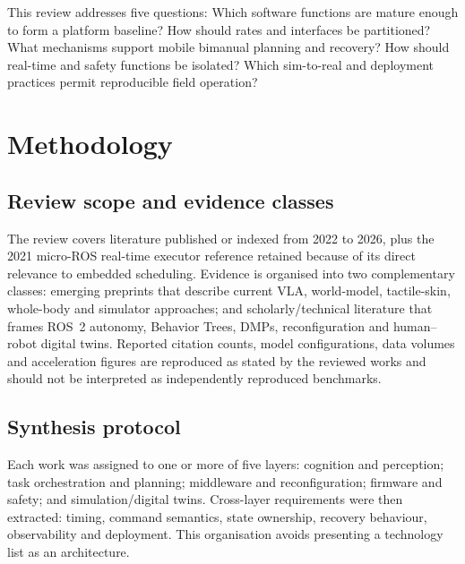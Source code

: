\documentclass[10pt,a4paper]{article}
\begin{document}
This review addresses five questions: Which software functions are mature enough to form a platform baseline? How should rates and interfaces be partitioned? What mechanisms support mobile bimanual planning and recovery? How should real-time and safety functions be isolated? Which sim-to-real and deployment practices permit reproducible field operation?

\section{Methodology}
\subsection{Review scope and evidence classes}
The review covers literature published or indexed from 2022 to 2026, plus the 2021 micro-ROS real-time executor reference retained because of its direct relevance to embedded scheduling. Evidence is organised into two complementary classes: emerging preprints that describe current VLA, world-model, tactile-skin, whole-body and simulator approaches; and scholarly/technical literature that frames ROS~2 autonomy, Behavior Trees, DMPs, reconfiguration and human--robot digital twins. Reported citation counts, model configurations, data volumes and acceleration figures are reproduced as stated by the reviewed works and should not be interpreted as independently reproduced benchmarks.

\subsection{Synthesis protocol}
Each work was assigned to one or more of five layers: cognition and perception; task orchestration and planning; middleware and reconfiguration; firmware and safety; and simulation/digital twins. Cross-layer requirements were then extracted: timing, command semantics, state ownership, recovery behaviour, observability and deployment. This organisation avoids presenting a technology list as an architecture.
\end{document}

